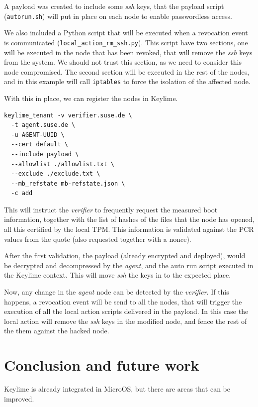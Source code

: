 \documentclass{article}
\begin{document}
A payload was created to include some \emph{ssh} keys, that the
payload script (\texttt{autorun.sh}) will put in place on each node to
enable passwordless access.

We also included a Python script that will be executed when a
revocation event is communicated (\texttt{local\_action\_rm\_ssh.py}).
This script have two sections, one will be executed in the node that
has been revoked, that will remove the \emph{ssh} keys from the
system.  We should not trust this section, as we need to consider this
node compromised.  The second section will be executed in the rest of
the nodes, and in this example will call \texttt{iptables} to force
the isolation of the affected node.

With this in place, we can register the nodes in Keylime.

\begin{verbatim}
keylime_tenant -v verifier.suse.de \
  -t agent.suse.de \
  -u AGENT-UUID \
  --cert default \
  --include payload \
  --allowlist ./allowlist.txt \
  --exclude ./exclude.txt \
  --mb_refstate mb-refstate.json \
  -c add
\end{verbatim}

This will instruct the \emph{verifier} to frequently request the
measured boot information, together with the list of hashes of the
files that the node has opened, all this certified by the local TPM.
This information is validated against the PCR values from the quote
(also requested together with a nonce).

After the first validation, the payload (already encrypted and
deployed), would be decrypted and decompressed by the \emph{agent},
and the auto run script executed in the Keylime context.  This will
move \emph{ssh} the keys in to the expected place.

Now, any change in the \emph{agent} node can be detected by the
\emph{verifier}. If this happens, a revocation event will be send to
all the nodes, that will trigger the execution of all the local action
scripts delivered in the payload.  In this case the local action will
remove the \emph{ssh} keys in the modified node, and fence the rest of
the them against the hacked node.

\section{Conclusion and future work}
Keylime is already integrated in MicroOS, but there are areas that can
be improved.
\end{document}
